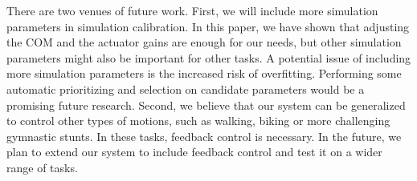 There are two venues of future work. First, we will include more simulation parameters in simulation calibration. In this paper, we have shown that adjusting the COM and the actuator gains are enough for our needs, but other simulation parameters might also be important for other tasks. A potential issue of including more simulation parameters is the increased risk of overfitting. Performing some automatic prioritizing and selection on candidate parameters would be a promising future research. Second, we believe that our system can be generalized to control other types of motions, such as walking, biking or more challenging gymnastic stunts. In these tasks, feedback control is necessary. In the future, we plan to extend our system to include feedback control and test it on a wider range of tasks.
